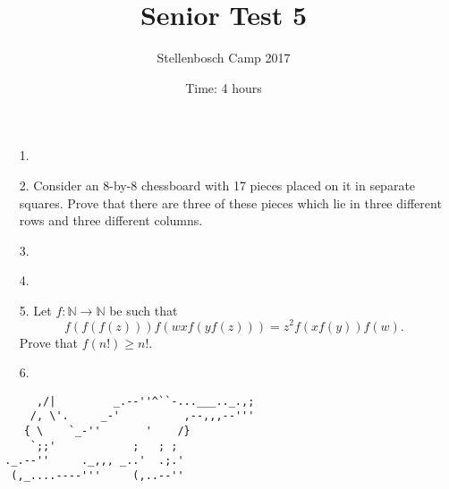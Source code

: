 \documentclass[12pt]{article}
\title{Senior Test 5}
\author{Stellenbosch Camp 2017}
\date{Time: 4 hours}
\begin{document}
 \maketitle

\begin{enumerate}

\item[1.] %


\item[2.] %
Consider an 8-by-8 chessboard with 17 pieces placed on it in separate squares. Prove that there are three of these pieces which lie in three different rows and three different columns.


\item[3.] %


\item[4.] %
 

\item[5.] %
Let $f : \mathbb{N} \to \mathbb{N}$ be such that
  \[ f(f(f(z))) f(wx f(y f(z))) = z^2 f(xf(y)) f(w) .\]
Prove that $f(n!) \geq n!$.


\item[6.] %


\end{enumerate}

\vfill

\centering
\begin{BVerbatim}
      ,/|         _.--''^``-...___.._.,;
     /, \'.     _-'          ,--,,,--'''
    { \    `_-''       '    /}
     `;;'            ;   ; ;
 ._.--''     ._,,, _..'  .;.'
  (,_....----'''     (,..--''
\end{BVerbatim}
\end{document}
